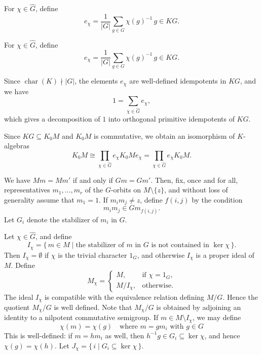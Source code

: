 \documentclass[11pt,reqno]{amsart}
\theoremstyle{plain}
\theoremstyle{remark}
\theoremstyle{definition}
\begin{document}
For $\chi \in \widehat{G}$, define
\[
e_{\chi}
=
\frac{1}{|G|}
\sum_{g \in G} \chi(g)^{-1}\, g
\in KG.
\]

For $\chi \in \widehat{G}$, define
\[
e_{\chi}
=
\frac{1}{|G|}
\sum_{g \in G} \chi(g)^{-1}\, g
\in KG.
\]

Since $\operatorname{char}(K)\nmid |G|$, the elements $e_\chi$ are well-defined idempotents in $KG$, and we have
\[
1 = \sum_{\chi \in \widehat{G}} e_{\chi},
\]
which gives a decomposition of $1$ into orthogonal primitive idempotents of $KG$.

Since $KG \subseteq K_0 M$ and $K_0 M$ is commutative, we obtain an isomorphism of $K$-algebras
\begin{equation}\label{6.1}
K_0 M
\cong
\prod_{\chi \in \widehat{G}} e_{\chi} K_0 M e_{\chi}
=
\prod_{\chi \in \widehat{G}} e_{\chi} K_0 M.
\end{equation}

We have $Mm =Mm'$ if and only if $Gm =Gm'$. Then, fix, once and for all, representatives $m_1,\dots,m_r$ of the
$G$-orbits on $M \setminus \{z\}$, and without loss of generality
assume that $m_1 = 1$.
If $m_i m_j \neq z$, define $f(i,j)$ by the condition
\[
m_i m_j \in G m_{f(i,j)}.
\]
Let $G_i$ denote the stabilizer of $m_i$ in $G$. 

Let $\chi \in \widehat{G}$, and define
\[
I_{\chi} = \{\, m \in M \mid \text{the stabilizer of $m$ in $G$ is not contained in } \ker \chi \,\}.
\]
Then $I_{\chi} = \emptyset$ if $\chi$ is the trivial character $1_G$, 
and otherwise $I_{\chi}$ is a proper ideal of $M$. 
Define
\[
M_{\chi} =
\begin{cases}
M, & \text{if } \chi = 1_G,\\
M/I_{\chi}, & \text{otherwise.}
\end{cases}
\]
The ideal $I_{\chi}$ is compatible with the equivalence relation
defining $M/G$. Hence the quotient $M_{\chi}/G$ is well defined.
Note that $M_{\chi}/G$ is obtained by adjoining an identity to a
nilpotent commutative semigroup.
If $m \in M \setminus I_{\chi}$, we may define
\[
\chi(m) = \chi(g) \quad \text{where } m = g m_i \text{ with } g \in G
\]
This is well-defined: if $m = h m_i$ as well, then $h^{-1}g \in G_i \subseteq \ker \chi$, and hence $\chi(g)=\chi(h)$.
Let
\(
J_{\chi} = \{\, i \mid G_i \subseteq \ker \chi \,\}.
\)
\end{document}

